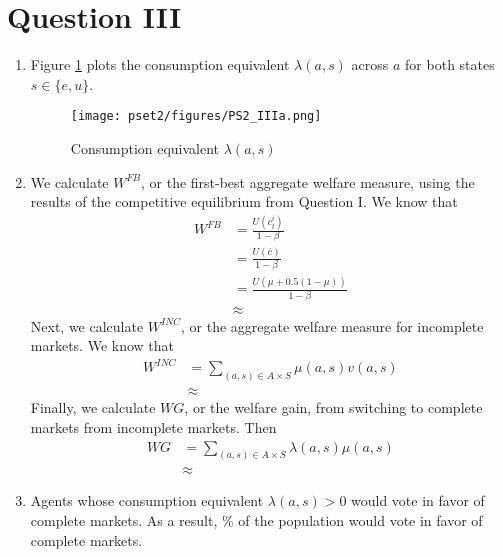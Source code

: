 \documentclass[12pt]{article}
\begin{document}
\section*{Question III}
\begin{enumerate}[label=(\alph*)]
    \item Figure \ref{fig:iii.a} plots the consumption equivalent $\lambda(a,s)$ across $a$ for both states $s \in \{e,u\}$.
    \begin{figure}[h!]
        \centering
        \texttt{[image: pset2/figures/PS2\_IIIa.png]}
        \caption{Consumption equivalent $\lambda(a,s)$}
        \label{fig:iii.a}
    \end{figure}
    
    \item We calculate $W^{FB}$, or the first-best aggregate welfare measure, using the results of the competitive equilibrium from Question I. We know that
        \begin{align*}
        W^{FB} &= \frac{U(c_t^i)}{1-\beta} \\[4pt]
        &= \frac{U(\bar{c})}{1-\beta} \\[4pt]
        &= \frac{U(\mu + 0.5(1-\mu))}{1-\beta} \\[4pt]
        &\approx
        \end{align*}
    Next, we calculate $W^{INC}$, or the aggregate welfare measure for incomplete markets. We know that
        \begin{align*}
        W^{INC} &= \sum_{(a,s) \in A \times S} \mu(a,s) v(a,s) \\
        &\approx 
        \end{align*}
    Finally, we calculate $WG$, or the welfare gain, from switching to complete markets from incomplete markets. Then
        \begin{align*}
        WG &= \sum_{(a,s) \in A \times S} \lambda(a,s) \mu(a,s) \\
        &\approx 
        \end{align*}
    
    \item Agents whose consumption equivalent $\lambda(a,s) > 0$ would vote in favor of complete markets. As a result, \% of the population would vote in favor of complete markets.
\end{enumerate}
\end{document}
